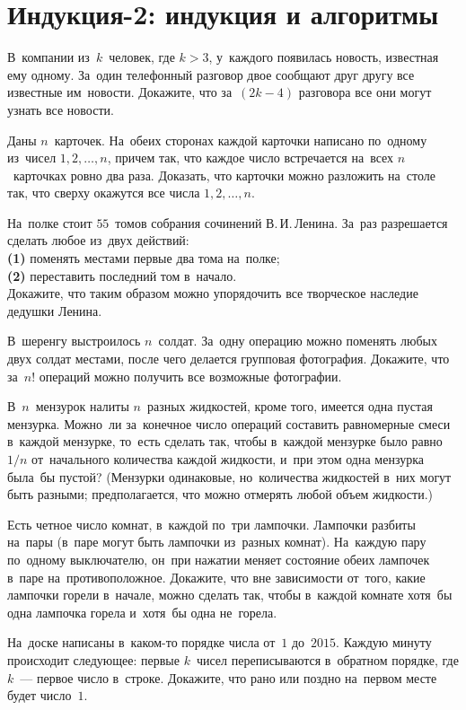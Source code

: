 
\section*{Индукция-2: индукция и алгоритмы}


\begin{problems}

\item
В~компании из~$k$~человек, где $k > 3$, у~каждого появилась новость, известная
ему одному.
За~один телефонный разговор двое сообщают друг другу все известные им~новости.
Докажите, что за~$(2 k - 4)$ разговора все они могут узнать все новости.

\item
Даны $n$~карточек.
На~обеих сторонах каждой карточки написано по~одному из~чисел
$1, 2, \ldots, n$, причем так, что каждое число встречается на~всех
$n$~карточках ровно два раза.
Доказать, что карточки можно разложить на~столе так, что сверху окажутся все
числа $1, 2, \ldots, n$.

\item
На~полке стоит $55$~томов собрания сочинений В.\,И.\,Ленина.
За~раз разрешается сделать любое из~двух действий:
\\
\textbf{(1)} поменять местами первые два тома на~полке;
\\
\textbf{(2)} переставить последний том в~начало.
\\
Докажите, что таким образом можно упорядочить все творческое наследие дедушки
Ленина.

\item
В~шеренгу выстроилось $n$~солдат.
За~одну операцию можно поменять любых двух солдат местами, после чего делается
групповая фотография.
Докажите, что за~$n!$ операций можно получить все возможные фотографии.

\item
В~$n$~мензурок налиты $n$~разных жидкостей, кроме того, имеется одна пустая
мензурка.
Можно~ли за~конечное число операций составить равномерные смеси в~каждой
мензурке, то~есть сделать так, чтобы в~каждой мензурке было равно $1 / n$
от~начального количества каждой жидкости, и~при этом одна мензурка была~бы
пустой?
(Мензурки одинаковые, но~количества жидкостей в~них могут быть разными;
предполагается, что можно отмерять любой объем жидкости.)

\item
Есть четное число комнат, в~каждой по~три лампочки.
Лампочки разбиты на~пары (в~паре могут быть лампочки из~разных комнат).
На~каждую пару по~одному выключателю, он~при нажатии меняет состояние обеих
лампочек в~паре на~противоположное.
Докажите, что вне зависимости от~того, какие лампочки горели в~начале, можно
сделать так, чтобы в~каждой комнате хотя~бы одна лампочка горела и~хотя~бы одна
не~горела.

\item
На~доске написаны в~каком-то порядке числа от~$1$ до~$2015$.
Каждую минуту происходит следующее: первые $k$~чисел переписываются в~обратном
порядке, где $k$~--- первое число в~строке.
Докажите, что рано или поздно на~первом месте будет число~$1$.

\end{problems}

